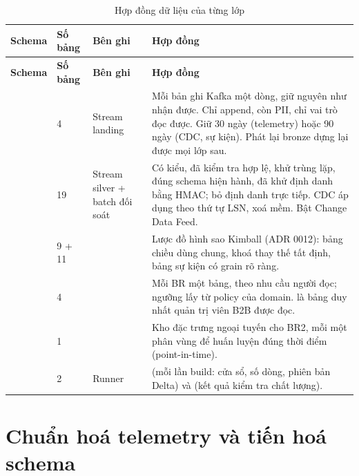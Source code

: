 {\small
\begin{longtable}{@{}L{1.7cm}L{1.4cm}L{3.2cm}L{8.2cm}@{}}
\caption{Hợp đồng dữ liệu của từng lớp}\label{tab:layers-contract}\\
\toprule
\textbf{Schema} & \textbf{Số bảng} & \textbf{Bên ghi} & \textbf{Hợp đồng} \\
\midrule
\endfirsthead
\toprule
\textbf{Schema} & \textbf{Số bảng} & \textbf{Bên ghi} & \textbf{Hợp đồng} \\
\midrule
\endhead
{} & 4 & Stream landing & Mỗi bản ghi Kafka một dòng, giữ nguyên như nhận được. Chỉ append, còn PII, chỉ vai trò  đọc được. Giữ 30 ngày (telemetry) hoặc 90 ngày (CDC, sự kiện). Phát lại bronze dựng lại được mọi lớp sau. \\
 & 19 & Stream silver + batch đối soát & Có kiểu, đã kiểm tra hợp lệ, khử trùng lặp, đúng schema hiện hành, đã khử định danh bằng HMAC; bỏ định danh trực tiếp. CDC áp dụng theo thứ tự LSN, xoá mềm. Bật Change Data Feed. \\
 & 9 + 11 &  & Lược đồ hình sao Kimball (ADR 0012): bảng chiều dùng chung, khoá thay thế tất định, bảng sự kiện có grain rõ ràng. \\
 & 4 &  & Mỗi BR một bảng, theo nhu cầu người đọc; ngưỡng lấy từ policy của domain.  là bảng duy nhất quản trị viên B2B được đọc. \\
 & 1 &  & Kho đặc trưng ngoại tuyến cho BR2, mỗi  một phân vùng để huấn luyện đúng thời điểm (point-in-time). \\
 & 2 & Runner &  (mỗi lần build: cửa sổ, số dòng, phiên bản Delta) và  (kết quả kiểm tra chất lượng). \\
\bottomrule
\end{longtable}}

\section{Chuẩn hoá telemetry và tiến hoá schema}

